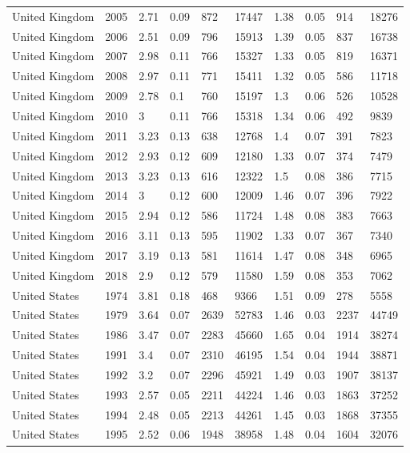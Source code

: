 \begin{tabular}{llllllllll}
United Kingdom & 2005 & 2.71 & 0.09 & 872 & 17447 & 1.38 & 0.05 & 914 & 18276 \\ 
United Kingdom & 2006 & 2.51 & 0.09 & 796 & 15913 & 1.39 & 0.05 & 837 & 16738 \\ 
United Kingdom & 2007 & 2.98 & 0.11 & 766 & 15327 & 1.33 & 0.05 & 819 & 16371 \\ 
United Kingdom & 2008 & 2.97 & 0.11 & 771 & 15411 & 1.32 & 0.05 & 586 & 11718 \\ 
United Kingdom & 2009 & 2.78 & 0.1 & 760 & 15197 & 1.3 & 0.06 & 526 & 10528 \\ 
United Kingdom & 2010 & 3 & 0.11 & 766 & 15318 & 1.34 & 0.06 & 492 & 9839 \\ 
United Kingdom & 2011 & 3.23 & 0.13 & 638 & 12768 & 1.4 & 0.07 & 391 & 7823 \\ 
United Kingdom & 2012 & 2.93 & 0.12 & 609 & 12180 & 1.33 & 0.07 & 374 & 7479 \\ 
United Kingdom & 2013 & 3.23 & 0.13 & 616 & 12322 & 1.5 & 0.08 & 386 & 7715 \\ 
United Kingdom & 2014 & 3 & 0.12 & 600 & 12009 & 1.46 & 0.07 & 396 & 7922 \\ 
United Kingdom & 2015 & 2.94 & 0.12 & 586 & 11724 & 1.48 & 0.08 & 383 & 7663 \\ 
United Kingdom & 2016 & 3.11 & 0.13 & 595 & 11902 & 1.33 & 0.07 & 367 & 7340 \\ 
United Kingdom & 2017 & 3.19 & 0.13 & 581 & 11614 & 1.47 & 0.08 & 348 & 6965 \\ 
United Kingdom & 2018 & 2.9 & 0.12 & 579 & 11580 & 1.59 & 0.08 & 353 & 7062 \\ 
United States & 1974 & 3.81 & 0.18 & 468 & 9366 & 1.51 & 0.09 & 278 & 5558 \\ 
United States & 1979 & 3.64 & 0.07 & 2639 & 52783 & 1.46 & 0.03 & 2237 & 44749 \\ 
United States & 1986 & 3.47 & 0.07 & 2283 & 45660 & 1.65 & 0.04 & 1914 & 38274 \\ 
United States & 1991 & 3.4 & 0.07 & 2310 & 46195 & 1.54 & 0.04 & 1944 & 38871 \\ 
United States & 1992 & 3.2 & 0.07 & 2296 & 45921 & 1.49 & 0.03 & 1907 & 38137 \\ 
United States & 1993 & 2.57 & 0.05 & 2211 & 44224 & 1.46 & 0.03 & 1863 & 37252 \\ 
United States & 1994 & 2.48 & 0.05 & 2213 & 44261 & 1.45 & 0.03 & 1868 & 37355 \\ 
United States & 1995 & 2.52 & 0.06 & 1948 & 38958 & 1.48 & 0.04 & 1604 & 32076 \\ 

\end{tabular}

